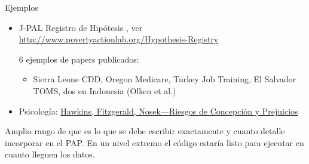 \documentclass{beamer}
\begin{document}

\begin{frame}{Ejemplos}

\begin{itemize}[<.->]
\item
J-PAL Registro de Hipótesis , ver \url{http://www.povertyactionlab.org/Hypothesis-Registry}

6 ejemplos de papers publicados:
\begin{itemize}
\item
 Sierra Leone CDD, Oregon Medicare, Turkey Job Training, El Salvador TOMS, dos en Indonesia (Olken et al.)
\end{itemize}
\item Psicología: \href{http://pss.sagepub.com/content/26/2/249}{Hawkins, Fitzgerald, Nosek---Riesgos de Concepción y Prejuicios}
\end{itemize} 
\vspace{0.25in}

Amplio rango de que es lo que se debe escribir exactamente y cuanto detalle incorporar en el PAP. En un nivel extremo el código estaría listo para ejecutar en cuanto lleguen los datos.
\end{frame}
\end{document}
